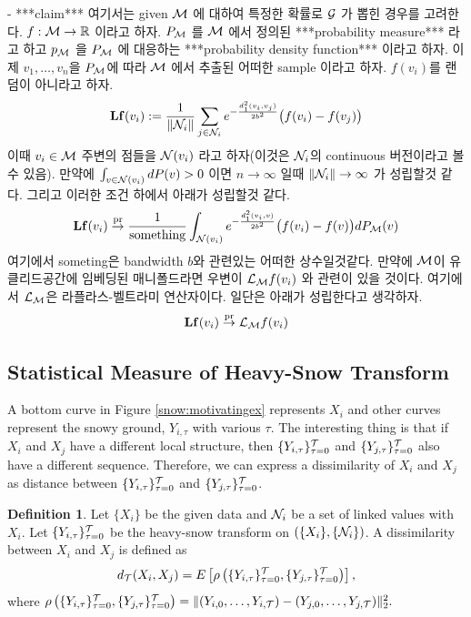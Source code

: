 \documentclass[preprint, review, 12pt]{article}
\theoremstyle{definition}
\newtheorem{dfn}{Definition}
\theoremstyle{remark}
\begin{document}
- ***claim*** 여기서는 given ${\cal M}$ 에 대하여 특정한 확률로 ${\cal G}$ 가 뽑힌 경우를 고려한다. $f:{\cal M} \to \mathbb{R}$ 이라고 하자. $P_{\cal M}$ 를 ${\cal M}$ 에서 정의된 ***probability measure*** 라고 하고 $p_{\cal M}$ 을 $P_{\cal M}$ 에 대응하는 ***probability density function*** 이라고 하자. 이제 $v_1,\dots,v_n$을 $P_{\cal M}$에 따라 ${\cal M}$ 에서 추출된 어떠한 sample 이라고 하자. $f(v_i)$를  랜덤이 아니라고 하자. 
\begin{align}
{\bf Lf}(v_i):=\frac{1}{\|{\cal N}_ i\|}\sum_{j \in {\cal N}_ i} e^{ -\frac{d_1^2(v_i,v_j)}{2b^2} } \big(f(v_i)-f(v_j)\big)
\end{align}
이때 $v_i \in {\cal M}$ 주변의 점들을 ${\cal N}(v_i)$ 라고 하자(이것은 ${\cal N}_ i$의 continuous 버전이라고 볼 수 있음). 만약에 $\int_{v \in {\cal N}(v_i)} dP(v)>0$ 이면 $n \to \infty$ 일때 $\|{\cal N}_ i \| \to \infty$ 가 성립할것 같다.
그리고 이러한 조건 하에서 아래가 성립할것 같다. 
\begin{align}
{\bf Lf}(v_i) \overset{\operatorname{pr}}{\rightarrow}\frac{1}{\mbox{something} }\int_{ {\cal N}(v_i)} e^{ -\frac{d_1^2(v_i,v)}{2b^2} } \big(f(v_i)-f(v)\big)dP_{\cal M}(v)
\end{align}
여기에서 someting은 bandwidth $b$와 관련있는 어떠한 상수일것같다. 만약에 ${\cal M}$이 유클리드공간에 임베딩된 매니폴드라면 우변이 ${\cal L}_ {\cal M}f(v_i)$ 와 관련이 있을 것이다. 여기에서 ${\cal L}_ {\cal M}$은 라플라스-벨트라미 연산자이다. 일단은 아래가 성립한다고 생각하자. 
\begin{align}
{\bf Lf}(v_i) \overset{\operatorname{pr}}{\rightarrow} {\cal L}_ {\cal M}f(v_i)
\end{align}

\iffalse
\subsection{Statistical Measure of Heavy-Snow Transform}

A bottom curve in Figure \ref{snow:motivatingex} represents $X_i$ and other curves represent the snowy ground, $Y_{i,\tau}$ with various $\tau$. The interesting thing is that if $X_i$ and $X_j$ have a different local structure, then $\{Y_{i,\tau}\}_{\tau=0}^{\cal T}$ and $\{Y_{j,\tau}\}_{\tau=0}^{\cal T}$ also have a different sequence. Therefore, we can express a dissimilarity of $X_i$ and $X_j$ as distance between $\{Y_{i,\tau}\}_{\tau=0}^{\cal T}$ and $\{Y_{j,\tau}\}_{\tau=0}^{\cal T}$.

\begin{dfn}
	Let $\{X_i\}$ be the given data and ${\cal N}_{i}$ be a set of linked values with $X_i$. Let  $\{Y_{i,\tau}\}_{\tau=0}^{\cal T}$ be the heavy-snow transform on $(\{X_i\},\{{\cal N}_i\})$. A dissimilarity between $X_i$ and $X_j$ is defined as
	\[
	d_{\cal T}(X_i,X_j)=E\left[\rho\left(\{Y_{i,\tau}\}_{\tau=0}^{\cal T},\{Y_{j,\tau}\}_{\tau=0}^{\cal T}\right)\right], 
	\]
	where $\rho\left(\{Y_{i,\tau}\}_{\tau=0}^{\cal T},\{Y_{j,\tau}\}_{\tau=0}^{\cal T}\right)=\|(Y_{i,0},\dots,Y_{i,{\cal T}})-(Y_{j,0},\dots,Y_{j,{\cal T}}) \|_2^2.$
\end{dfn}
\end{document}

